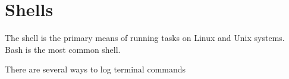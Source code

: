 \section{Shells}
The shell is the primary means of running tasks on Linux and Unix systems.
Bash is the most common shell.



There are several ways to log terminal commands


